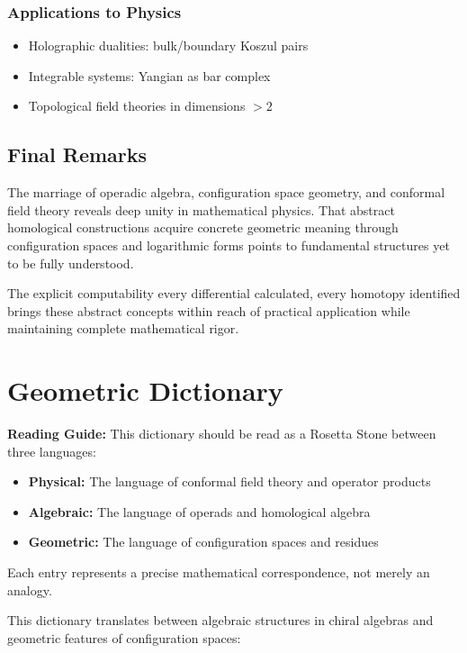 \subsubsection{Applications to Physics}
\begin{itemize}
\item Holographic dualities: bulk/boundary Koszul pairs
\item Integrable systems: Yangian as bar complex
\item Topological field theories in dimensions $> 2$
\end{itemize}
 

\subsection{Final Remarks}
 
The marriage of operadic algebra, configuration space geometry, and conformal field theory reveals deep unity in mathematical physics. That abstract homological constructions acquire concrete geometric meaning through configuration spaces and logarithmic forms points to fundamental structures yet to be fully understood.
 
The explicit computability every differential calculated, every homotopy identified brings these abstract concepts within reach of practical application while maintaining complete mathematical rigor.
 
\appendix
\section{Geometric Dictionary}

\textbf{Reading Guide:} This dictionary should be read as a Rosetta Stone between three languages:
\begin{itemize}
\item \textbf{Physical:} The language of conformal field theory and operator products
\item \textbf{Algebraic:} The language of operads and homological algebra  
\item \textbf{Geometric:} The language of configuration spaces and residues
\end{itemize}
Each entry represents a precise mathematical correspondence, not merely an analogy.


This dictionary translates between algebraic structures in chiral algebras and geometric features of configuration spaces:


